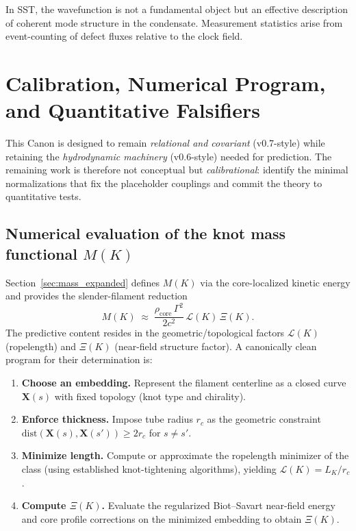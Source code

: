 \documentclass[10pt]{article}
\newcommand{\rhocore}{\rho_{\text{core}}}
\begin{document}
        In SST, the wavefunction is not a fundamental object but an effective
        description of coherent mode structure in the condensate. Measurement
        statistics arise from event-counting of defect fluxes relative to the
        clock field.

    
    \section{Calibration, Numerical Program, and Quantitative Falsifiers}
    \label{sec:calibration_program}

This Canon is designed to remain \emph{relational and covariant} (v0.7-style) while
retaining the \emph{hydrodynamic machinery} (v0.6-style) needed for prediction.
The remaining work is therefore not conceptual but \emph{calibrational}: identify
the minimal normalizations that fix the placeholder couplings and commit the theory
to quantitative tests.

\subsection{Numerical evaluation of the knot mass functional $M(K)$}
\label{sec:mass_numerics_program}

Section~\ref{sec:mass_expanded} defines $M(K)$ via the core-localized kinetic energy
and provides the slender-filament reduction
\begin{equation}
M(K)\;\approx\;\frac{\rhocore\,\Gamma^2}{2c^2}\,\mathcal{L}(K)\,\Xi(K).
\end{equation}
The predictive content resides in the geometric/topological factors
$\mathcal{L}(K)$ (ropelength) and $\Xi(K)$ (near-field structure factor). A
canonically clean program for their determination is:

\begin{enumerate}
\item \textbf{Choose an embedding.} Represent the filament centerline as a closed curve
$\mathbf{X}(s)$ with fixed topology (knot type and chirality).
\item \textbf{Enforce thickness.} Impose tube radius $r_c$ as the geometric constraint
$\mathrm{dist}(\mathbf{X}(s),\mathbf{X}(s'))\ge 2r_c$ for $s\neq s'$.
\item \textbf{Minimize length.} Compute or approximate the ropelength minimizer of the class
(using established knot-tightening algorithms), yielding $\mathcal{L}(K)=L_K/r_c$.
\item \textbf{Compute $\Xi(K)$.} Evaluate the regularized Biot--Savart near-field energy and
core profile corrections on the minimized embedding to obtain $\Xi(K)$.
\end{enumerate}
\end{document}
